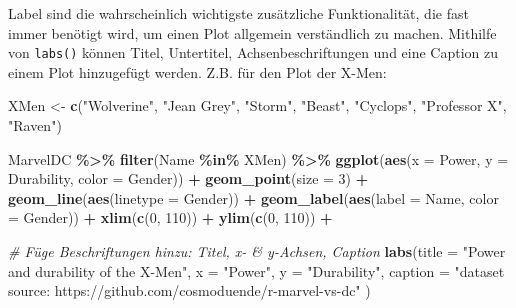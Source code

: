 \documentclass[
  ngerman,
]{book}
\newenvironment{Shaded}{\begin{snugshade}}{\end{snugshade}}
\newcommand{\AttributeTok}[1]{\textcolor[rgb]{0.13,0.29,0.53}{#1}}
\newcommand{\CommentTok}[1]{\textcolor[rgb]{0.56,0.35,0.01}{\textit{#1}}}
\newcommand{\DecValTok}[1]{\textcolor[rgb]{0.00,0.00,0.81}{#1}}
\newcommand{\FunctionTok}[1]{\textcolor[rgb]{0.13,0.29,0.53}{\textbf{#1}}}
\newcommand{\NormalTok}[1]{#1}
\newcommand{\OtherTok}[1]{\textcolor[rgb]{0.56,0.35,0.01}{#1}}
\newcommand{\SpecialCharTok}[1]{\textcolor[rgb]{0.81,0.36,0.00}{\textbf{#1}}}
\newcommand{\StringTok}[1]{\textcolor[rgb]{0.31,0.60,0.02}{#1}}
\begin{document}
{Label} sind die wahrscheinlich wichtigste zusätzliche Funktionalität, die fast immer benötigt wird, um einen Plot allgemein verständlich zu machen. Mithilfe von \texttt{labs()} können Titel, Untertitel, Achsenbeschriftungen und eine Caption zu einem Plot hinzugefügt werden. Z.B. für den Plot der X-Men:

\begin{Shaded}
\begin{Highlighting}[]
\NormalTok{XMen }\OtherTok{\textless{}{-}} \FunctionTok{c}\NormalTok{(}\StringTok{"Wolverine"}\NormalTok{, }\StringTok{"Jean Grey"}\NormalTok{, }\StringTok{"Storm"}\NormalTok{, }\StringTok{"Beast"}\NormalTok{, }
          \StringTok{"Cyclops"}\NormalTok{, }\StringTok{"Professor X"}\NormalTok{, }\StringTok{"Raven"}\NormalTok{)}

\NormalTok{MarvelDC }\SpecialCharTok{\%\textgreater{}\%}
  \FunctionTok{filter}\NormalTok{(Name }\SpecialCharTok{\%in\%}\NormalTok{ XMen) }\SpecialCharTok{\%\textgreater{}\%}
  \FunctionTok{ggplot}\NormalTok{(}\FunctionTok{aes}\NormalTok{(}\AttributeTok{x =}\NormalTok{ Power, }
             \AttributeTok{y =}\NormalTok{ Durability, }
             \AttributeTok{color =}\NormalTok{ Gender)) }\SpecialCharTok{+}
  \FunctionTok{geom\_point}\NormalTok{(}\AttributeTok{size =} \DecValTok{3}\NormalTok{) }\SpecialCharTok{+} 
  \FunctionTok{geom\_line}\NormalTok{(}\FunctionTok{aes}\NormalTok{(}\AttributeTok{linetype =}\NormalTok{ Gender)) }\SpecialCharTok{+}
  \FunctionTok{geom\_label}\NormalTok{(}\FunctionTok{aes}\NormalTok{(}\AttributeTok{label =}\NormalTok{ Name, }
                 \AttributeTok{color =}\NormalTok{ Gender)) }\SpecialCharTok{+}
  \FunctionTok{xlim}\NormalTok{(}\FunctionTok{c}\NormalTok{(}\DecValTok{0}\NormalTok{, }\DecValTok{110}\NormalTok{)) }\SpecialCharTok{+}
  \FunctionTok{ylim}\NormalTok{(}\FunctionTok{c}\NormalTok{(}\DecValTok{0}\NormalTok{, }\DecValTok{110}\NormalTok{)) }\SpecialCharTok{+}

  \CommentTok{\# Füge Beschriftungen hinzu: Titel, x{-} \& y{-}Achsen, Caption}
  \FunctionTok{labs}\NormalTok{(}\AttributeTok{title =} \StringTok{"Power and durability of the X{-}Men"}\NormalTok{,}
         \AttributeTok{x =} \StringTok{"Power"}\NormalTok{, }
         \AttributeTok{y =} \StringTok{"Durability"}\NormalTok{,}
         \AttributeTok{caption =} \StringTok{"dataset source: https://github.com/cosmoduende/r{-}marvel{-}vs{-}dc"}\NormalTok{ )}
\end{Highlighting}
\end{Shaded}
\end{document}
